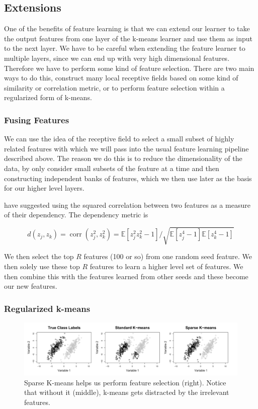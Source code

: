\documentclass{article} %
\DeclareMathOperator{\corr}{corr}
\begin{document}
\subsection{Extensions}

One of the benefits of feature learning is that we can extend our learner to take the output features from one layer of the k-means learner and use them as input to the next layer. We have to be careful when extending the feature learner to multiple layers, since we can end up with very high dimensional features. Therefore we have to perform some kind of feature selection. There are two main ways to do this, construct many local receptive fields based on some kind of similarity or correlation metric, or to perform feature selection within a regularized form of k-means.

\subsubsection{Fusing Features}

We can use the idea of the receptive field \cite{barrow87} to select a small subset of highly related features with which we will pass into the usual feature learning pipeline described above. The reason we do this is to reduce the dimensionality of the data, by only consider small subsets of the feature at a time and then constructing independent banks of features, which we then use later as the basis for our higher level layers.

\cite{coates} have suggested using the squared correlation between two features as a measure of their dependency. The dependency metric is

\begin{equation}
d(z_j, z_k) = \corr(z_j^2, z_k^2) = \mathbb{E}[z_j^2z_k^2-1]/\sqrt{\mathbb{E}[z_j^4 - 1]\mathbb{E}[z_k^4-1]}
\end{equation}

We then select the top $R$ features (100 or so) from one random seed feature. We then solely use these top $R$ features to learn a higher level set of features. We then combine this with the features learned from other seeds and these become our new features.

\subsubsection{Regularized k-means}

\begin{figure}
  \includegraphics[width=\columnwidth]{./images/sparse.png}
  \caption{Sparse K-means helps us perform feature selection (right). Notice that without it (middle), k-means gets distracted by the irrelevant features.}
  \label{figSparseKM}
\end{figure}
\end{document}
